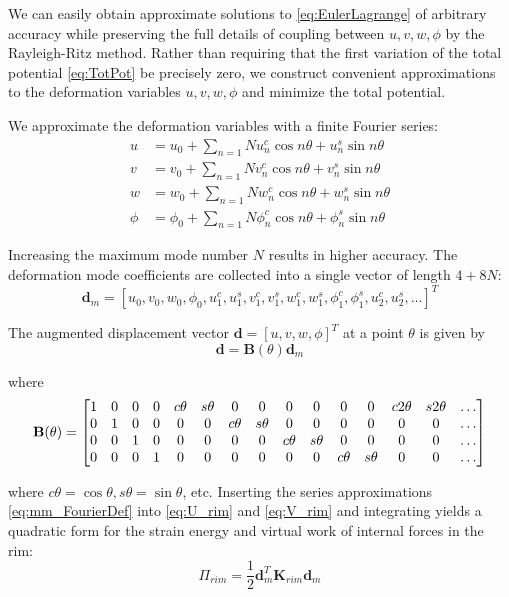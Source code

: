\documentclass[\rootdir/thesis.tex]{subfiles}
\begin{document}
We can easily obtain approximate solutions to \eqref{eq:EulerLagrange} of arbitrary accuracy while preserving the full details of coupling between $u,v,w,\phi$ by the Rayleigh-Ritz method. Rather than requiring that the first variation of the total potential \eqref{eq:TotPot} be precisely zero, we construct convenient approximations to the deformation variables $u,v,w,\phi$ and minimize the total potential.

We approximate the deformation variables with a finite Fourier series:
\begin{align}
\label{eq:mm_FourierDef}
u &= u_0 + \sum_{n=1}{N} u_n^c \cos{n\theta} + u_n^s \sin{n\theta}\\
v &= v_0 + \sum_{n=1}{N} v_n^c \cos{n\theta} + v_n^s \sin{n\theta}\\
w &= w_0 + \sum_{n=1}{N} w_n^c \cos{n\theta} + w_n^s \sin{n\theta}\\
\phi &= \phi_0 + \sum_{n=1}{N} \phi_n^c \cos{n\theta} + \phi_n^s \sin{n\theta}
\end{align}

Increasing the maximum mode number $N$ results in higher accuracy. The deformation mode coefficients are collected into a single vector of length $4+8N$:
\begin{equation}
\mathbf{d}_m = [u_0,v_0,w_0,\phi_0,u_1^c,u_1^s,v_1^c,v_1^s,w_1^c,w_1^s,\phi_1^c,\phi_1^s,u_2^c,u_2^s,\dots]^T
\end{equation}

The augmented displacement vector $\mathbf{d}=[u,v,w,\phi]^T$ at a point $\theta$ is given by
\begin{equation}
\label{eq:u_Bd}
\mathbf{d} = \mathbf{B}(\theta)\mathbf{d}_m
\end{equation}

where
\begin{equation}
\setcounter{MaxMatrixCols}{16}
\mathbf{B}(\theta) =
\begin{bmatrix}
1 & 0 & 0 & 0 & c\theta & s\theta & 0 & 0 & 0 & 0 & 0 & 0 & c2\theta & s2\theta & \dots\\
0 & 1 & 0 & 0 & 0 & 0 & c\theta & s\theta & 0 & 0 & 0 & 0 & 0 & 0 & \dots\\
0 & 0 & 1 & 0 & 0 & 0 & 0 & 0 & c\theta & s\theta & 0 & 0 & 0 & 0 & \dots\\
0 & 0 & 0 & 1 & 0 & 0 & 0 & 0 & 0 & 0 & c\theta & s\theta & 0 & 0 & \dots
\end{bmatrix}
\end{equation}

where $c\theta=\cos{\theta}, s\theta=\sin{\theta}$, etc. Inserting the series approximations \eqref{eq:mm_FourierDef} into \eqref{eq:U_rim} and \eqref{eq:V_rim} and integrating yields a quadratic form for the strain energy and virtual work of internal forces in the rim:
\begin{equation}
\label{eq:mm_U_rim}
\Pi_{rim} = \frac{1}{2} \mathbf{d}_m^T \mathbf{K}_{rim} \mathbf{d}_m
\end{equation}
\end{document}
